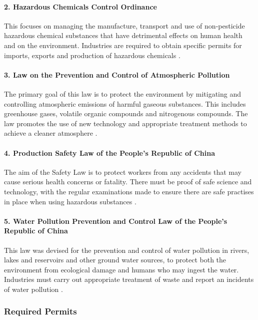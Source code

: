 \paragraph{2. Hazardous Chemicals Control Ordinance
}
This focuses on managing the manufacture, transport and use of non-pesticide hazardous chemical substances that have detrimental effects on human health and on the environment. Industries are required to obtain specific permits for imports, exports and production of hazardous chemicals \cite{govuk_hazardous_nodate}. 


\paragraph{3. Law on the Prevention and Control of Atmospheric Pollution}
The primary goal of this law is to protect the environment by mitigating and controlling atmospheric emissions of harmful gaseous substances. This includes greenhouse gases, volatile organic compounds and nitrogenous compounds. The law promotes the use of new technology and appropriate treatment methods to achieve a cleaner atmosphere \cite{vizzuality_law_nodate}. 

\paragraph{4. Production Safety Law of the People's Republic of China}
The aim of the Safety Law is to protect workers from any accidents that may cause serious health concerns or fatality. There must be proof of safe science and technology, with the regular examinations made to ensure there are safe practises in place when using hazardous substances \cite{standing_committee_of_the_national_peoples_congress_production_nodate}.  

\paragraph{5. Water Pollution Prevention and Control Law of the People's Republic of China  }
This law was devised for the prevention and control of water pollution in rivers, lakes and reservoirs and other ground water sources, to protect both the environment from ecological damage and humans who may ingest the water. Industries must carry out appropriate treatment of waste and report an incidents of water pollution \cite{govuk_waste_nodate}. 

\subsubsection{Required Permits}


